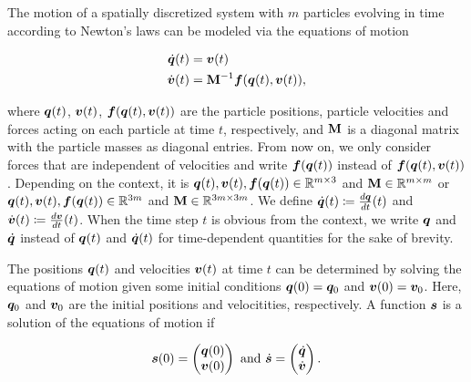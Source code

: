 The motion of a spatially discretized system with $m$ particles evolving in time according to Newton's laws can be modeled via 
the equations of motion

\begin{align}
    \begin{split}\label{eq:equations-of-motion}
        \dot{\bm{q}}(t) &= \bm{v}(t) \\
        \dot{\bm{v}}(t) &= \mathbf{M}^{-1}\bm{f}(\bm{q}(t), \bm{v}(t)),
    \end{split}
\end{align}

\noindent where $\bm{q}(t)$, $\bm{v}(t)$, $\bm{f}(\bm{q}(t), \bm{v}(t))$ are the particle positions, particle velocities and 
forces acting on each particle at time $t$, respectively, and $\mathbf{M}$ is a diagonal matrix with the particle masses as diagonal entries. 
From now on, we only consider forces that are independent of velocities and write $\bm{f}(\bm{q}(t))$ instead of 
$\bm{f}(\bm{q}(t), \bm{v}(t))$. Depending on the context, it is
$\bm{q}(t), \bm{v}(t), \bm{f}(\bm{q}(t)) \in \mathbb{R}^{m \times 3}$ and $\mathbf{M} \in \mathbb{R}^{m \times m}$ or 
$\bm{q}(t), \bm{v}(t), \bm{f}(\bm{q}(t)) \in \mathbb{R}^{3m}$ and $\mathbf{M} 
\in \mathbb{R}^{3m \times 3m}$. We define $\dot{\bm{q}}(t) \coloneqq \frac{d\bm{q}}{dt}(t)$ and $\dot{\bm{v}}(t) \coloneqq 
\frac{d\bm{v}}{dt}(t)$. When the time step $t$ is obvious from the context, we write $\bm{q}$ and $\dot{\bm{q}}$ instead of 
$\bm{q}(t)$ and $\dot{\bm{q}}(t)$ for time-dependent quantities for the sake of brevity.

The positions $\bm{q}(t)$ and velocities $\bm{v}(t)$ at time $t$ can be determined by solving the equations of motion given some initial conditions
$\bm{q}(0) = \bm{q}_0$ and $\bm{v}(0) = \bm{v}_0$. Here, $\bm{q}_0$ and $\bm{v}_0$ are the initial positions and velocitities, respectively. 
A function $\bm{s}$ is a solution of the equations of motion if 

\[
    \bm{s}(0) = 
    \begin{pmatrix}
        \bm{q}(0)\\
        \bm{v}(0)
    \end{pmatrix} 
    \text{ and } 
    \dot{\bm{s}} = 
    \begin{pmatrix}
        \dot{\bm{q}}\\
        \dot{\bm{v}}
    \end{pmatrix}.
\]

